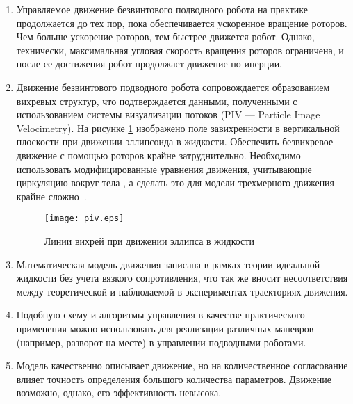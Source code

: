 \begin{enumerate}
	\item	Управляемое движение безвинтового подводного робота на практике продолжается до тех пор, пока обеспечивается ускоренное вращение роторов. Чем больше ускорение роторов, тем быстрее движется робот. Однако, технически, максимальная угловая скорость вращения роторов ограничена, и после ее достижения робот продолжает движение по инерции.
	\item	Движение безвинтового подводного робота сопровождается образованием вихревых структур, что подтверждается данными, полученными с использованием системы визуализации потоков (PIV --- Particle Image Velocimetry). На рисунке \ref{piv} изображено поле завихренности в вертикальной плоскости при движении эллипсоида в жидкости. Обеспечить безвихревое движение с помощью роторов крайне затруднительно. Необходимо использовать модифицированные уравнения движения, учитывающие циркуляцию вокруг тела \cite{Kilin_Vetchanin_DAN_2016}, а сделать это для модели трехмерного движения крайне сложно~\cite{Tallapragada_Kelly_2013}.
	
	\begin{figure}[h!]
		\begin{center}
			\texttt{[image: piv.eps]}
			\caption{Линии вихрей при движении эллипса в жидкости} \label{piv}
		\end{center}
	\end{figure}
	
	\item Математическая модель движения записана в рамках теории идеальной жидкости без учета вязкого сопротивления, что так же вносит несоответствия между теоретической и наблюдаемой в экспериментах траекториях движения.
	\item Подобную схему и алгоритмы управления в качестве практического применения можно использовать для реализации различных маневров (например, разворот на месте) в управлении подводными роботами.
	\item Модель качественно описывает движение, но на количественное согласование влияет точность определения большого количества параметров. Движение возможно, однако, его эффективность невысока.

\end{enumerate}


